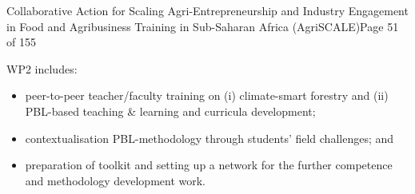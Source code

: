 \documentclass[
  11pt,
]{article}
\begin{document}
Collaborative Action for Scaling Agri-Entrepreneurship and Industry
Engagement in Food and Agribusiness Training in Sub-Saharan Africa
(AgriSCALE)Page 51 of 155

WP2 includes:

\begin{itemize}
\item
  peer-to-peer teacher/faculty training on (i) climate-smart forestry
  and (ii) PBL-based teaching \& learning and curricula development;
\item
  contextualisation PBL-methodology through students' field challenges;
  and
\item
  preparation of toolkit and setting up a network for the further
  competence and methodology development work.
\end{itemize}

\providecommand{\docline}[3]{\noalign{\global\setlength{\arrayrulewidth}{#1}}\arrayrulecolor[HTML]{#2}\cline{#3}}

\setlength{\tabcolsep}{2pt}

\renewcommand*{\arraystretch}{1.5}
\end{document}
